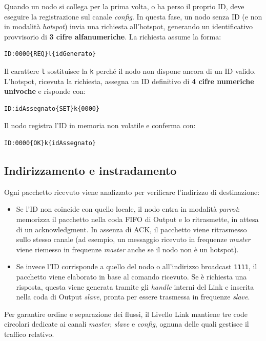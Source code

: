 Quando un nodo si collega per la prima volta, o ha perso il proprio ID, deve eseguire la registrazione sul canale \emph{config}. 
In questa fase, un nodo senza ID (e non in modalità \emph{hotspot}) invia una richiesta all’hotspot, generando un identificativo provvisorio di \textbf{3 cifre alfanumeriche}. 
La richiesta assume la forma:

\begin{verbatim}
ID:0000{REQ}l{idGenerato}
\end{verbatim}

Il carattere \texttt{l} sostituisce la \texttt{k} perché il nodo non dispone ancora di un ID valido.  
L’hotspot, ricevuta la richiesta, assegna un ID definitivo di \textbf{4 cifre numeriche univoche} e risponde con:

\begin{verbatim}
ID:idAssegnato{SET}k{0000}
\end{verbatim}

Il nodo registra l’ID in memoria non volatile e conferma con:

\begin{verbatim}
ID:0000{OK}k{idAssegnato}
\end{verbatim}

\subsection{Indirizzamento e instradamento}

Ogni pacchetto ricevuto viene analizzato per verificare l’indirizzo di destinazione: 
\begin{itemize}
  \item Se l’ID non coincide con quello locale, il nodo entra in modalità \emph{parrot}: memorizza il pacchetto nella coda FIFO di Output e lo ritrasmette, in attesa di un acknowledgment. 
  In assenza di ACK, il pacchetto viene ritrasmesso sullo stesso canale (ad esempio, un messaggio ricevuto in frequenze \emph{master} viene riemesso in frequenze \emph{master} anche se il nodo non è un hotspot).  
  \item Se invece l’ID corrisponde a quello del nodo o all’indirizzo broadcast \texttt{1111}, il pacchetto viene elaborato in base al comando ricevuto. 
  Se è richiesta una risposta, questa viene generata tramite gli \emph{handle} interni del Link e inserita nella coda di Output \emph{slave}, pronta per essere trasmessa in frequenze \emph{slave}.
\end{itemize}

Per garantire ordine e separazione dei flussi, il Livello Link mantiene tre code circolari dedicate ai canali \emph{master}, \emph{slave} e \emph{config}, ognuna delle quali gestisce il traffico relativo.


